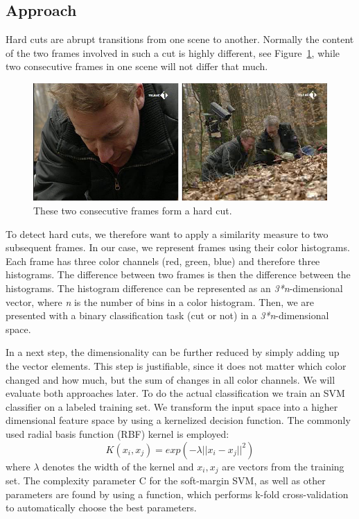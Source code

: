 \subsection{Approach}
\label{sec:hard_cut_approach}

Hard cuts are abrupt transitions from one scene to another.
Normally the content of the two frames involved in such a cut is highly different, see Figure~\ref{fig:hard_cut_example}, while two consecutive frames in one scene will not differ that much.

\begin{figure}
	\centering
	\includegraphics[scale=.7]{images/hard_cut_example.png}
	\caption{These two consecutive frames form a hard cut.}
	\label{fig:hard_cut_example}
\end{figure}

To detect hard cuts, we therefore want to apply a similarity measure to two subsequent frames.
In our case, we represent frames using their color histograms.
Each frame has three color channels (red, green, blue) and therefore three histograms.
The difference between two frames is then the difference between the histograms.
The histogram difference can be represented as an \emph{3*n}-dimensional vector, where \emph{n} is the number of bins in a color histogram.
Then, we are presented with a binary classification task (cut or not) in a \emph{3*n}-dimensional space.

In a next step, the dimensionality can be further reduced by simply adding up the vector elements.
This step is justifiable, since it does not matter which color changed and how much, but the sum of changes in all color channels.
We will evaluate both approaches later.
To do the actual classification we train an SVM classifier on a labeled training set.
We transform the input space into a higher dimensional feature space by using a kernelized decision function. The commonly used radial basis function (RBF) kernel is employed:
$$K(x_i,x_j) = exp(-\lambda || x_i - x_j ||^2)$$
where $\lambda$ denotes the width of the kernel and $x_i, x_j $ are vectors from the training set.
The complexity parameter C for the soft-margin SVM, as well as other parameters are found by using a function, which performs k-fold cross-validation to automatically choose the best parameters.
